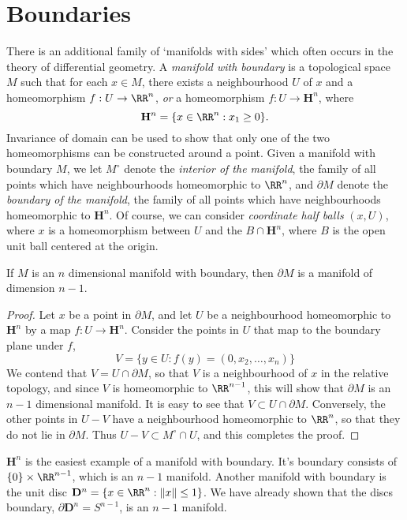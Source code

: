 \section{Boundaries}

There is an additional family of `manifolds with sides' which often occurs in the theory of differential geometry. A \emph{manifold with boundary} is a topological space $M$ such that for each $x \in M$, there exists a neighbourhood $U$ of $x$ and a homeomorphism $f:U \to \RR^n$, \emph{or} a homeomorphism $f: U \to \mathbf{H}^n$, where
%
\[ \mathbf{H}^n = \{ x \in \RR^n: x_1 \geq 0 \}. \]
%
Invariance of domain can be used to show that only one of the two homeomorphisms can be constructed around a point. Given a manifold with boundary $M$, we let $M^\circ$ denote the \emph{interior of the manifold}, the family of all points which have neighbourhoods homeomorphic to $\RR^n$, and $\partial M$ denote the \emph{boundary of the manifold}, the family of all points which have neighbourhoods homeomorphic to $\mathbf{H}^n$. Of course, we can consider \emph{coordinate half balls} $(x,U)$, where $x$ is a homeomorphism between $U$ and the $B \cap \mathbf{H}^n$, where $B$ is the open unit ball centered at the origin.

\begin{theorem}
    If $M$ is an $n$ dimensional manifold with boundary, then $\partial M$ is a manifold of dimension $n-1$.
\end{theorem}
\begin{proof}
    Let $x$ be a point in $\partial M$, and let $U$ be a neighbourhood homeomorphic to $\mathbf{H}^n$ by a map $f:U \to \mathbf{H}^n$. Consider the points in $U$ that map to the boundary plane under $f$,
    \[ V = \{ y \in U : f(y) = (0,x_2, \dots, x_n) \} \]
    We contend that $V = U \cap \partial M$, so that $V$ is a neighbourhood of $x$ in the relative topology, and since $V$ is homeomorphic to $\RR^{n-1}$, this will show that $\partial M$ is an $n-1$ dimensional manifold. It is easy to see that $V \subset U \cap \partial M$. Conversely, the other points in $U - V$ have a neighbourhood homeomorphic to $\RR^n$, so that they do not lie in $\partial M$. Thus $U - V \subset M^\circ \cap U$, and this completes the proof.
\end{proof}

\begin{example}
    $\mathbf{H}^n$ is the easiest example of a manifold with boundary. It's boundary consists of $\{ 0 \} \times \RR^{n-1}$, which is an $n - 1$ manifold. Another manifold with boundary is the unit disc $\mathbf{D}^n = \{ x \in \RR^n : \|x\| \leq 1 \}$. We have already shown that the discs boundary, $\partial \mathbf{D}^n = S^{n-1}$, is an $n - 1$ manifold.
\end{example}

